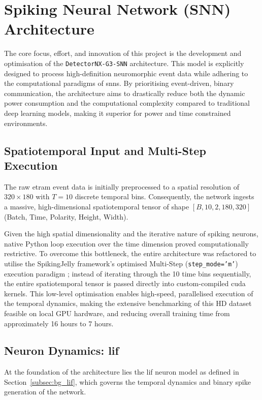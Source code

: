 \section{Spiking Neural Network (SNN) Architecture}
\label{sec:snn_architecture}

The core focus, effort, and innovation of this project is the development and optimisation of the \texttt{DetectorNX-G3-SNN} architecture. 
This model is explicitly designed to process high-definition neuromorphic event data while adhering to the computational paradigms of \glspl{snn}. 
By prioritising event-driven, binary communication, the architecture aims to drastically reduce both the dynamic power consumption and the computational complexity compared to traditional deep learning models, making it superior for power and time constrained environments.

\subsection{Spatiotemporal Input and Multi-Step Execution}
\label{subsec:snn_input}
The raw \gls{etram} event data is initially preprocessed to a spatial resolution of $320 \times 180$ with $T=10$ discrete temporal bins.
Consequently, the network ingests a massive, high-dimensional spatiotemporal tensor of shape $[B, 10, 2, 180, 320]$ (Batch, Time, Polarity, Height, Width). 

Given the high spatial dimensionality and the iterative nature of spiking neurons, native Python loop execution over the time dimension proved computationally restrictive. 
To overcome this bottleneck, the entire architecture was refactored to utilise the SpikingJelly framework's optimised Multi-Step (\texttt{step\_mode='m'}) execution paradigm \cite{fang2023spikingjelly};
instead of iterating through the 10 time bins sequentially, the entire spatiotemporal tensor is passed directly into custom-compiled \gls{cuda} kernels.
This low-level optimisation enables high-speed, parallelised execution of the temporal dynamics, making the extensive benchmarking of this HD dataset feasible on local GPU hardware, and reducing overall training time from approximately 16 hours to 7 hours.

\subsection{Neuron Dynamics: \gls{lif}}
\label{subsec:snn_lif}
At the foundation of the architecture lies the \gls{lif} neuron model as defined in Section~\ref{subsec:bg_lif}, which governs the temporal dynamics and binary spike generation of the network.

